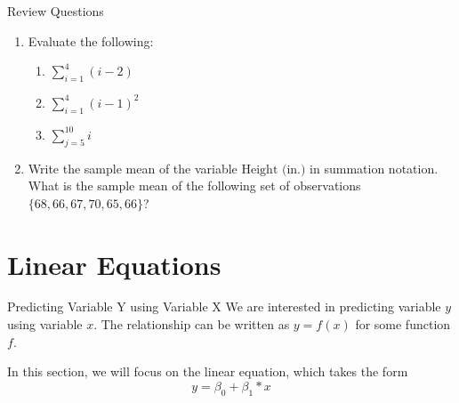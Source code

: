\documentclass[aspectratio=169,t,11pt,table]{beamer}
\begin{document}
\begin{frame}{Review Questions}
  \begin{enumerate}
    \item Evaluate the following:
  
    \begin{enumerate}
      \item $\sum_{i=1}^4 (i - 2)$

      \smallskip
      \item $\sum_{i=1}^4 (i - 1)^2$

      \smallskip
      \item $\sum_{j = 5}^{10} i$
    \end{enumerate}  
    
    \pause
    \bigskip
    \item Write the sample mean of the variable $\text{Height (in.)}$ in summation notation. What is the sample mean of the following set of observations $\{ 68, 66, 67, 70, 65, 66 \}$?
  \end{enumerate}
\end{frame}

\section{Linear Equations}

\begin{frame}{Predicting Variable Y using Variable X}
  We are interested in predicting variable $y$ using variable $x$. The relationship can be written as $y = f(x)$ for some function $f$.
  
  \bigskip
  In this section, we will focus on the linear equation, which takes the form 
  \begin{equation*}
    y = \beta_0 + \beta_1 * x
  \end{equation*} 
\end{frame}
\end{document}
